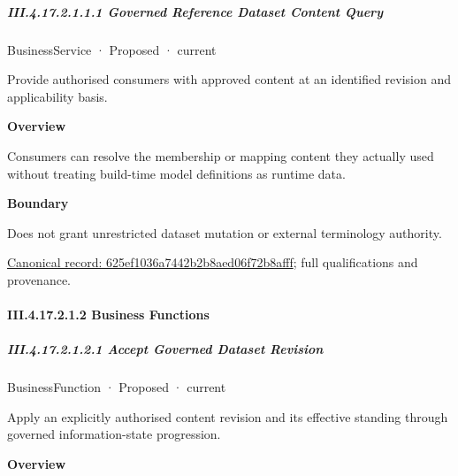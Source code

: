 \subparagraph*{III.4.17.2.1.1.1 Governed Reference Dataset Content Query}
\label{navigation:III.4.17.2.1.1.1}

\label{element:625ef1036a7442b2b8aed06f72b8afff}
{\small BusinessService · Proposed · current}\par

Provide authorised consumers with approved content at an identified revision and applicability basis.



\textbf{Overview}



Consumers can resolve the membership or mapping content they actually used without treating build-time model definitions as runtime data.



\textbf{Boundary}



Does not grant unrestricted dataset mutation or external terminology authority.


{\footnotesize \href{../../../../../../../../continuum/business/business-service/625ef1036a7442b2b8aed06f72b8afff.md}{Canonical record: 625ef1036a7442b2b8aed06f72b8afff}; full qualifications and provenance.}\par
\paragraph*{III.4.17.2.1.2 Business Functions}
\label{navigation:III.4.17.2.1.2}

\subparagraph*{III.4.17.2.1.2.1 Accept Governed Dataset Revision}
\label{navigation:III.4.17.2.1.2.1}

\label{element:96c1c089e7f2443dbd3ad5beab6a3011}
{\small BusinessFunction · Proposed · current}\par

Apply an explicitly authorised content revision and its effective standing through governed information-state progression.



\textbf{Overview}




